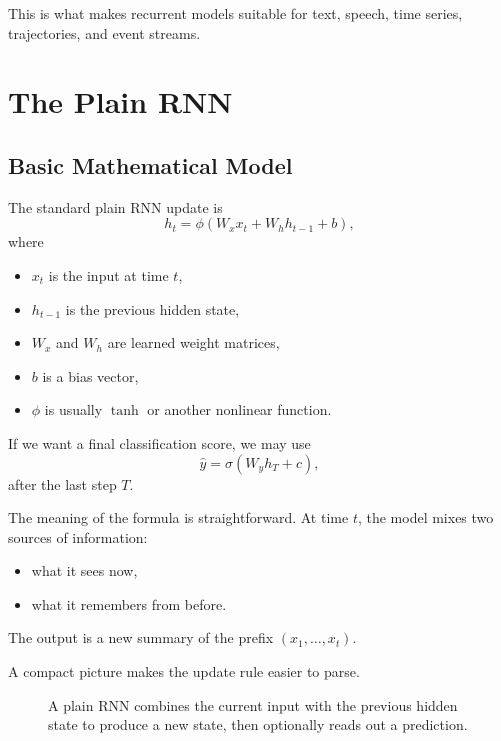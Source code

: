\documentclass[12pt,a4paper]{article}
\begin{document}
This is what makes recurrent models suitable for text, speech, time series, trajectories, and event streams.

\section{The Plain RNN}

\subsection{Basic Mathematical Model}

The standard plain RNN update is
\[
h_t = \phi(W_x x_t + W_h h_{t-1} + b),
\]
where
\begin{itemize}
  \item \(x_t\) is the input at time \(t\),
  \item \(h_{t-1}\) is the previous hidden state,
  \item \(W_x\) and \(W_h\) are learned weight matrices,
  \item \(b\) is a bias vector,
  \item \(\phi\) is usually \(\tanh\) or another nonlinear function.
\end{itemize}

If we want a final classification score, we may use
\[
\hat{y} = \sigma(W_y h_T + c),
\]
after the last step \(T\).

The meaning of the formula is straightforward. At time \(t\), the model mixes two sources of information:
\begin{itemize}
  \item what it sees now,
  \item what it remembers from before.
\end{itemize}

The output is a new summary of the prefix \((x_1,\dots,x_t)\).

A compact picture makes the update rule easier to parse.

\begin{figure}[htbp]
\centering
{}
\caption{A plain RNN combines the current input with the previous hidden state to produce a new state, then optionally reads out a prediction.}
\label{fig:rnn-en}
\end{figure}
\end{document}
